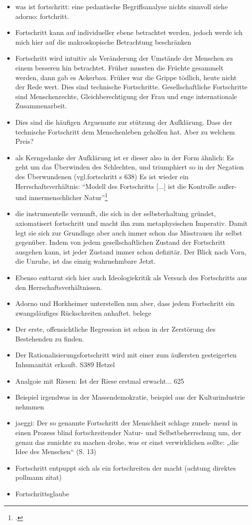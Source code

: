 \documentclass[a4paper, 12pt]{article}
\begin{document}
\begin{onehalfspace}
\begin{itemize}
  \item was ist fortschritt: eine pedantische Begriffsanalyse nichts sinnvoll siehe adorno: fortchritt. 
  \item Fortschritt kann auf individueller ebene betrachtet werden, jedoch werde ich mich hier auf die makroskopische Betrachtung beschränken
  \item Fortschritt wird intuitiv als Veränderung der Umstände der Menschen zu einem besseren hin betrachtet. Früher mussten die Früchte gesammelt werden, dann gab es Ackerbau. Früher war die Grippe tödlich, heute nicht der Rede wert. Dies sind technische Fortschritte. Gesellschaftliche Fortschritte sind Menschenrechte, Gleichberechtigung der Frau und enge internationale Zusammenarbeit. 
  \item Dies sind die häufigen Arguemnte zur stützung der Aufklärung. Dass der technische Fortschritt dem Menschenleben geholfen hat. Aber zu welchem Preis?
  \item als Kerngedanke der Aufklärung ist er dieser also in der Form ähnlich: Es geht um das Überwinden des Schlechten, und triumphiert so in der Negation des Überwundenen (vgl.fortschritt s 638) Es ist wieder ein Herrschaftsverhältnis: "`Modell des Fortschritts [...] ist die Kontrolle außer- und innermenschlicher Natur"'\footnote{\Cite[Siehe][S. 623]{fortschritt}.}
  \item die instrumentelle vernunft, die sich in der selbsterhaltung gründet, axiomatisert fortschritt und macht ihn zum metaphysischen Imperativ. Damit legt sie sich zur Grundlage aber auch immer schon das Misstrauen ihr selbst gegenüber. Indem von jedem gesellschaftlichen Zustand der Fortschritt ausgehen kann, ist jeder Zustand immer schon defizitär. Der Blick nach Vorn, die Unruhe, ist das einzig wahrnehmbare Jetzt.
  \item Ebenso enttarnt sich hier auch Ideologiekritik als Versuch des Fortschritts aus den Herrschaftsverhältnissen. 
  \item Adorno und Horkheimer unterstellen nun aber, dass jedem Fortschritt ein zwangsläufiges Rückschreiten anhaftet. belege
  \item Der erste, offensichtliche Regression ist schon in der Zerstörung des Bestehenden zu finden.
  \item Der Rationalisierungsfortschritt wird mit einer zum äußersten gesteigerten Inhumanität erkauft. S389 Hetzel
  \item Analgoie mit Riesen: Ist der Riese erstmal erwacht... 625
  \item Beispiel irgendwas in der Massendemokratie, beispiel aus der Kulturindustrie nehmmen
  \item jaeggi: Der so genannte Fortschritt der Menschheit schlage zuneh- mend in einen Prozess blind fortschreitender Natur- und Selbstbeherrschung um, der genau das zunichte zu machen drohe, was er einst verwirklichen sollte: „die Idee des Menschen“ (S. 13)
  \item Fortschritt entpuppt sich als ein fortschreiten der macht (achtung direktes pollmann zitat)
  \item Fortschrittsglaube
\end{itemize}



\end{onehalfspace}
\end{document}
